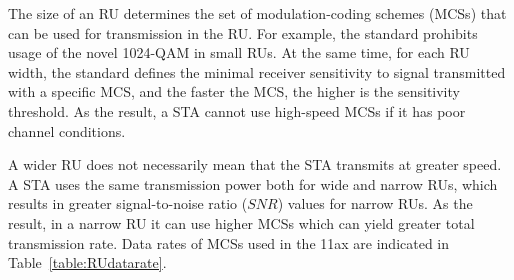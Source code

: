 The size of an RU determines the set of modulation-coding schemes (MCSs) that can be used for transmission in the RU.
For example, the standard prohibits usage of the novel 1024-QAM in small RUs.
At the same time, for each RU width, the standard defines the minimal receiver sensitivity to signal transmitted with a specific MCS, and the faster the MCS, the higher is the sensitivity threshold.
As the result, a STA cannot use high-speed MCSs if it has poor channel conditions.	

A wider RU does not necessarily mean that the STA transmits at greater speed.
A STA uses the same transmission power both for wide and narrow RUs, which results in greater signal-to-noise ratio ($SNR$) values for narrow RUs.
As the result, in a narrow RU it can use higher MCSs which can yield greater total transmission rate. 
Data rates of MCSs used in the 11ax are indicated in Table~\ref{table:RUdatarate}. 

\begin{table}[t]
	{\centering
		\caption{\label{table:RUdatarate} Data rate in different RU at each MCS in Mbps}
	}
\end{table}	

